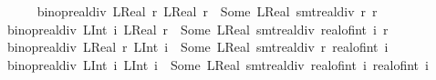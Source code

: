 \begin{isabellebody}
\ \ \ \isanewline
\ \ \ \ {\isachardoublequoteopen}binop{\isacharunderscore}{\kern0pt}real{\isacharunderscore}{\kern0pt}div\ {\isacharparenleft}{\kern0pt}LReal\ r{}{\isacharparenright}{\kern0pt}\ {\isacharparenleft}{\kern0pt}LReal\ r{}{\isacharparenright}{\kern0pt}\ {\isacharequal}{\kern0pt}\ Some\ {\isacharparenleft}{\kern0pt}LReal\ {\isacharparenleft}{\kern0pt}smt{\isacharunderscore}{\kern0pt}real{\isacharunderscore}{\kern0pt}div\ r{}\ r{}{\isacharparenright}{\kern0pt}{\isacharparenright}{\kern0pt}{\isachardoublequoteclose}\isanewline
\ \ {\isacharbar}{\kern0pt}\ {\isachardoublequoteopen}binop{\isacharunderscore}{\kern0pt}real{\isacharunderscore}{\kern0pt}div\ {\isacharparenleft}{\kern0pt}LInt\ i{}{\isacharparenright}{\kern0pt}\ {\isacharparenleft}{\kern0pt}LReal\ r{}{\isacharparenright}{\kern0pt}\ {\isacharequal}{\kern0pt}\ Some\ {\isacharparenleft}{\kern0pt}LReal\ {\isacharparenleft}{\kern0pt}smt{\isacharunderscore}{\kern0pt}real{\isacharunderscore}{\kern0pt}div\ {\isacharparenleft}{\kern0pt}real{\isacharunderscore}{\kern0pt}of{\isacharunderscore}{\kern0pt}int\ i{}{\isacharparenright}{\kern0pt}\ r{}{\isacharparenright}{\kern0pt}{\isacharparenright}{\kern0pt}{\isachardoublequoteclose}\isanewline
\ \ {\isacharbar}{\kern0pt}\ {\isachardoublequoteopen}binop{\isacharunderscore}{\kern0pt}real{\isacharunderscore}{\kern0pt}div\ {\isacharparenleft}{\kern0pt}LReal\ r{}{\isacharparenright}{\kern0pt}\ {\isacharparenleft}{\kern0pt}LInt\ i{}{\isacharparenright}{\kern0pt}\ {\isacharequal}{\kern0pt}\ Some\ {\isacharparenleft}{\kern0pt}LReal\ {\isacharparenleft}{\kern0pt}smt{\isacharunderscore}{\kern0pt}real{\isacharunderscore}{\kern0pt}div\ r{}\ {\isacharparenleft}{\kern0pt}real{\isacharunderscore}{\kern0pt}of{\isacharunderscore}{\kern0pt}int\ i{}{\isacharparenright}{\kern0pt}{\isacharparenright}{\kern0pt}{\isacharparenright}{\kern0pt}{\isachardoublequoteclose}\isanewline
\ \ {\isacharbar}{\kern0pt}\ {\isachardoublequoteopen}binop{\isacharunderscore}{\kern0pt}real{\isacharunderscore}{\kern0pt}div\ {\isacharparenleft}{\kern0pt}LInt\ i{}{\isacharparenright}{\kern0pt}\ {\isacharparenleft}{\kern0pt}LInt\ i{}{\isacharparenright}{\kern0pt}\ {\isacharequal}{\kern0pt}\ Some\ {\isacharparenleft}{\kern0pt}LReal\ {\isacharparenleft}{\kern0pt}smt{\isacharunderscore}{\kern0pt}real{\isacharunderscore}{\kern0pt}div\ {\isacharparenleft}{\kern0pt}real{\isacharunderscore}{\kern0pt}of{\isacharunderscore}{\kern0pt}int\ i{}{\isacharparenright}{\kern0pt}\ {\isacharparenleft}{\kern0pt}real{\isacharunderscore}{\kern0pt}of{\isacharunderscore}{\kern0pt}int\ i{}{\isacharparenright}{\kern0pt}{\isacharparenright}{\kern0pt}{\isacharparenright}{\kern0pt}{\isachardoublequoteclose}\isanewline

\end{isabellebody}
